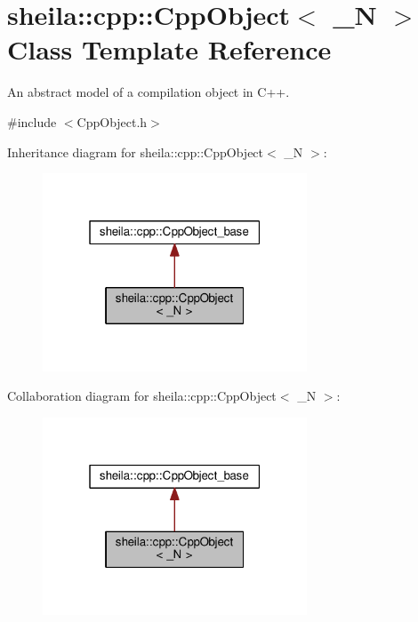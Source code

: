 \hypertarget{classsheila_1_1cpp_1_1CppObject}{}\section{sheila\+:\+:cpp\+:\+:Cpp\+Object$<$ \+\_\+N $>$ Class Template Reference}
\label{classsheila_1_1cpp_1_1CppObject}


An abstract model of a compilation object in C++.  




{\ttfamily \#include $<$Cpp\+Object.\+h$>$}



Inheritance diagram for sheila\+:\+:cpp\+:\+:Cpp\+Object$<$ \+\_\+N $>$\+:
\nopagebreak
\begin{figure}[H]
\begin{center}
\leavevmode
\includegraphics[width=223pt]{classsheila_1_1cpp_1_1CppObject__inherit__graph}
\end{center}
\end{figure}


Collaboration diagram for sheila\+:\+:cpp\+:\+:Cpp\+Object$<$ \+\_\+N $>$\+:
\nopagebreak
\begin{figure}[H]
\begin{center}
\leavevmode
\includegraphics[width=223pt]{classsheila_1_1cpp_1_1CppObject__coll__graph}
\end{center}
\end{figure}
